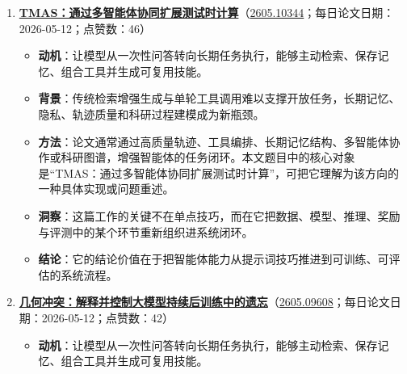\begin{enumerate}[leftmargin=1.5em]
\begin{itemize}[leftmargin=1.5em]
    \item \textbf{动机}：让模型从一次性问答转向长期任务执行，能够主动检索、保存记忆、组合工具并生成可复用技能。
    \item \textbf{背景}：传统检索增强生成与单轮工具调用难以支撑开放任务，长期记忆、隐私、轨迹质量和科研过程建模成为新瓶颈。
    \item \textbf{方法}：论文通常通过高质量轨迹、工具编排、长期记忆结构、多智能体协作或科研图谱，增强智能体的任务闭环。本文题目中的核心对象是“迈向视觉原生多模态深度搜索智能体的在线策略数据演化”，可把它理解为该方向的一种具体实现或问题重述。
    \item \textbf{洞察}：搜索能力的关键不只是召回相似文本，而是智能体如何与语料、工具和反馈形成闭环。
    \item \textbf{结论}：它的结论价值在于把智能体能力从提示词技巧推进到可训练、可评估的系统流程。
  \end{itemize}
  \item \textbf{\href{https://huggingface.co/papers/2605.10344}{TMAS：通过多智能体协同扩展测试时计算}}（\href{https://arxiv.org/abs/2605.10344}{2605.10344}；每日论文日期：2026-05-12；点赞数：46）
  \begin{itemize}[leftmargin=1.5em]
    \item \textbf{动机}：让模型从一次性问答转向长期任务执行，能够主动检索、保存记忆、组合工具并生成可复用技能。
    \item \textbf{背景}：传统检索增强生成与单轮工具调用难以支撑开放任务，长期记忆、隐私、轨迹质量和科研过程建模成为新瓶颈。
    \item \textbf{方法}：论文通常通过高质量轨迹、工具编排、长期记忆结构、多智能体协作或科研图谱，增强智能体的任务闭环。本文题目中的核心对象是“TMAS：通过多智能体协同扩展测试时计算”，可把它理解为该方向的一种具体实现或问题重述。
    \item \textbf{洞察}：这篇工作的关键不在单点技巧，而在它把数据、模型、推理、奖励与评测中的某个环节重新组织进系统闭环。
    \item \textbf{结论}：它的结论价值在于把智能体能力从提示词技巧推进到可训练、可评估的系统流程。
  \end{itemize}
  \item \textbf{\href{https://huggingface.co/papers/2605.09608}{几何冲突：解释并控制大模型持续后训练中的遗忘}}（\href{https://arxiv.org/abs/2605.09608}{2605.09608}；每日论文日期：2026-05-12；点赞数：42）
  \begin{itemize}[leftmargin=1.5em]
    \item \textbf{动机}：让模型从一次性问答转向长期任务执行，能够主动检索、保存记忆、组合工具并生成可复用技能。

\end{itemize}
\end{enumerate}
